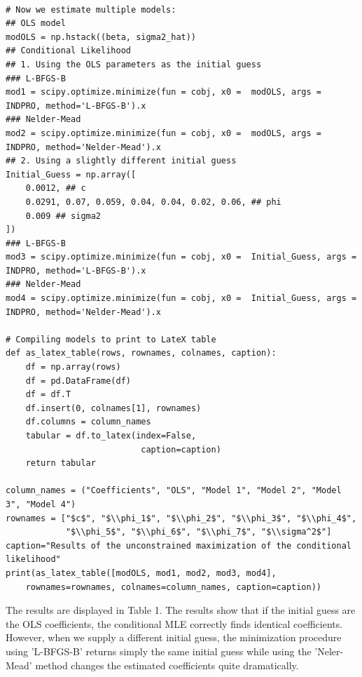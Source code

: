 \documentclass{article}
\begin{document}
\begin{verbatim}

# Now we estimate multiple models:
## OLS model
modOLS = np.hstack((beta, sigma2_hat))
## Conditional Likelihood
## 1. Using the OLS parameters as the initial guess
### L-BFGS-B
mod1 = scipy.optimize.minimize(fun = cobj, x0 =  modOLS, args = INDPRO, method='L-BFGS-B').x
### Nelder-Mead
mod2 = scipy.optimize.minimize(fun = cobj, x0 =  modOLS, args = INDPRO, method='Nelder-Mead').x
## 2. Using a slightly different initial guess
Initial_Guess = np.array([
    0.0012, ## c
    0.0291, 0.07, 0.059, 0.04, 0.04, 0.02, 0.06, ## phi
    0.009 ## sigma2 
])
### L-BFGS-B
mod3 = scipy.optimize.minimize(fun = cobj, x0 =  Initial_Guess, args = INDPRO, method='L-BFGS-B').x
### Nelder-Mead
mod4 = scipy.optimize.minimize(fun = cobj, x0 =  Initial_Guess, args = INDPRO, method='Nelder-Mead').x

# Compiling models to print to LateX table
def as_latex_table(rows, rownames, colnames, caption):
    df = np.array(rows)
    df = pd.DataFrame(df)
    df = df.T
    df.insert(0, colnames[1], rownames)
    df.columns = column_names
    tabular = df.to_latex(index=False,
                           caption=caption)
    return tabular

column_names = ("Coefficients", "OLS", "Model 1", "Model 2", "Model 3", "Model 4")
rownames = ["$c$", "$\\phi_1$", "$\\phi_2$", "$\\phi_3$", "$\\phi_4$", 
            "$\\phi_5$", "$\\phi_6$", "$\\phi_7$", "$\\sigma^2$"]
caption="Results of the unconstrained maximization of the conditional likelihood"
print(as_latex_table([modOLS, mod1, mod2, mod3, mod4], 
	rownames=rownames, colnames=column_names, caption=caption))
\end{verbatim}

The results are displayed in Table 1.
The results show that if the initial guess are the OLS coefficients, the conditional MLE correctly finds identical coefficients. However, when we supply a different initial guess, the minimization procedure using 'L-BFGS-B' returns simply the same initial guess while using the 'Neler-Mead' method changes the estimated coefficients quite dramatically.\\
\end{document}

